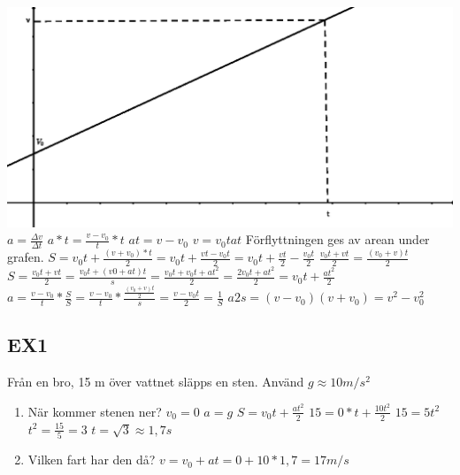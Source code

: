 \documentclass[a4paper,11pt]{article}
\begin{document}
\begin{flushleft}
\includegraphics{vt_diagram.eps}\newline
$ a = \frac{\Delta v}{\Delta t} $\newline
$ a*t = \frac{v-v_0}{t}*t $\newline
$ at = v-v_0 $\newline
$ v = v_0tat $\newline
Förflyttningen ges av arean under grafen.\newline
$ S = v_0 t+\frac{(v+v_0)*t}{2} = v_0 t +\frac{vt-v_0t}{2} = v_0t+\frac{vt}{2}-\frac{v_0t}{2} $\newline
$ \frac{v_0t+vt}{2} = \frac{(v_0+v)t}{2} $\newline
$ S = \frac{v_0t+vt}{2} = \frac{v_0t+(v0+at)t}{s} = \frac{v_0t+v_0t+at^2}{2} = \frac{2v_0t+at^2}{2} = v_0t+\frac{at^2}{2} $\newline\newline
$ a = \frac{v-v_0}{t} * \frac{S}{S} = \frac{v-v_0}{t} * \frac{\frac{(v_0+v)t}{2}}{s} = \frac{v-v_0t}{2} = \frac{1}{S} $\newline
$ a2s = (v-v_0)(v+v_0) = v^2-v_0^2 $\newline
\subsection{EX1}
Från en bro, 15 m över vattnet släpps en sten. Använd $g\approx 10m/s^2$
\begin{enumerate}
  \item När kommer stenen ner?\newline
  $ v_0 = 0$\newline
  $ a = g $\newline
  $ S = v_0t+\frac{at^2}{2} $\newline
  $ 15 = 0*t+\frac{10t^2}{2} $\newline
  $ 15 = 5t^2 $\newline
  $ t^2 = \frac{15}{5} = 3 $\newline
  $ t = \sqrt{3} \approx 1,7s $
  \item Vilken fart har den då?
  $ v = v_0 + at = 0+10*1,7 = 17 m/s $

\end{enumerate}
\end{flushleft}
\end{document}
